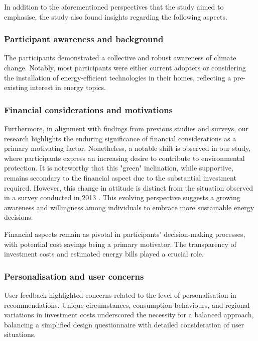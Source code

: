 In addition to the aforementioned perspectives that the study aimed to emphasise, the study also found insights regarding the following aspects.


\subsubsection*{Participant awareness and background}

The participants demonstrated a collective and robust awareness of climate change. 
Notably, most participants were either current adopters or considering the installation of energy-efficient technologies in their homes, reflecting a pre-existing interest in energy topics.


\subsubsection*{Financial considerations and motivations}

Furthermore, in alignment with findings from previous studies and surveys, our research highlights the enduring significance of financial considerations as a primary motivating factor. 
Nonetheless, a notable shift is observed in our study, where participants express an increasing desire to contribute to environmental protection.
It is noteworthy that this "green" inclination, while supportive, remains secondary to the financial aspect due to the substantial investment required. 
However, this change in attitude is distinct from the situation observed in a survey conducted in 2013 \cite{informationgap}. 
This evolving perspective suggests a growing awareness and willingness among individuals to embrace more sustainable energy decisions.

Financial aspects remain as pivotal in participants' decision-making processes, with potential cost savings being a primary motivator. 
The transparency of investment costs and estimated energy bills played a crucial role. 


\subsubsection*{Personalisation and user concerns}

User feedback highlighted concerns related to the level of personalisation in recommendations. 
Unique circumstances, consumption behaviours, and regional variations in investment costs underscored the necessity for a balanced approach, balancing a simplified design questionnaire with detailed consideration of user situations.


